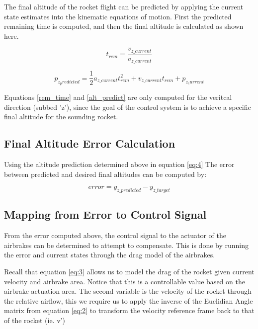 \documentclass[conference, letterpaper]{IEEEtran}
\begin{document}
The final altitude of the rocket flight can be predicted by applying the current state estimates
into the kinematic equations of motion. First the predicted remaining time is computed, and then
the final altitude is calculated as shown here.

\begin{equation}\label{eq:rem_time}
  t_{rem} = \frac{v_{z\_current}}{a_{z\_current}}
\end{equation}

\begin{equation}\label{eq:alt_predict}
  p_{z_predicted} = \frac{1}{2}a_{z\_current}t_{rem}^2 + v_{z\_current}t_{rem} + p_{z_current}
\end{equation}

Equations \ref{rem_time} and \ref{alt_predict} are only computed for the veritcal direction (subbed 'z'),
since the goal of the control system is to achieve a specific final altitude for
the sounding rocket.

\subsection{Final Altitude Error Calculation}

Using the altitude prediction determined above in equation \ref{eq:4} The error between predicted and desired final altitudes can be computed by:

\begin{equation}\label{eq:7}
  error = y_{z\_predicted} - y_{z\_target}
\end{equation}


\subsection{Mapping from Error to Control Signal}

From the error computed above, the control signal to the actuator of the airbrakes can be determined
to attempt to compensate. This is done by running the error and current states through the
drag model of the airbrakes.

Recall that equation \ref{eq:3} allows us to model the drag of the rocket given current velocity and
airbrake area. Notice that this is a controllable value based on the airbrake actuation area.  The second
variable is the velocity of the rocket through the relative airflow, this we require us to apply the
inverse of the Euclidian Angle matrix from equation \ref{eq:2} to transform the velocity reference frame
back to that of the rocket (ie. v')
\end{document}

